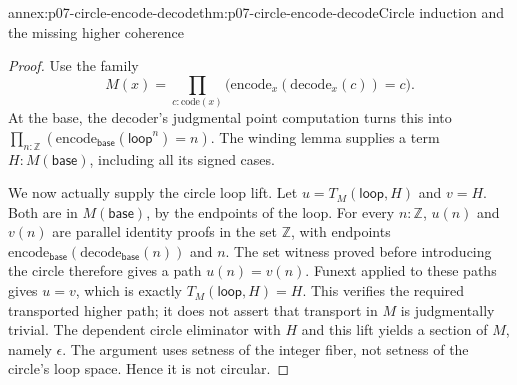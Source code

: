 \begin{annexitem}{annex:p07-circle-encode-decode}{thm:p07-circle-encode-decode}{Circle induction and the missing higher coherence}
\begin{proof}
Use the family
\[
M(x)=\prod_{c:\mathrm{code}(x)}
       \bigl(\mathrm{encode}_x(\mathrm{decode}_x(c))=c\bigr).
\]
At the base, the decoder's judgmental point computation turns this
into
\(\prod_{n:\mathbb Z}
(\mathrm{encode}_{\mathsf{base}}(\mathsf{loop}^n)=n)\).
The winding lemma supplies a term \(H:M(\mathsf{base})\), including
all its signed cases.

We now actually supply the circle loop lift. Let
\(u=T_M(\mathsf{loop},H)\) and \(v=H\).
Both are in \(M(\mathsf{base})\), by the endpoints of the loop.
For every \(n:\mathbb Z\), \(u(n)\) and \(v(n)\) are parallel
identity proofs in the set \(\mathbb Z\), with endpoints
\(\mathrm{encode}_{\mathsf{base}}(\mathrm{decode}_{\mathsf{base}}(n))\)
and \(n\). The set witness proved before introducing the circle
therefore gives a path \(u(n)=v(n)\). Funext applied to these paths
gives \(u=v\), which is exactly \(T_M(\mathsf{loop},H)=H\).
This verifies the required transported higher path; it does not
assert that transport in \(M\) is judgmentally trivial.
The dependent circle eliminator with \(H\) and this lift yields a
section of \(M\), namely \(\epsilon\).
The argument uses setness of the integer fiber, not setness of the
circle's loop space. Hence it is not circular.
\end{proof}
\end{annexitem}

